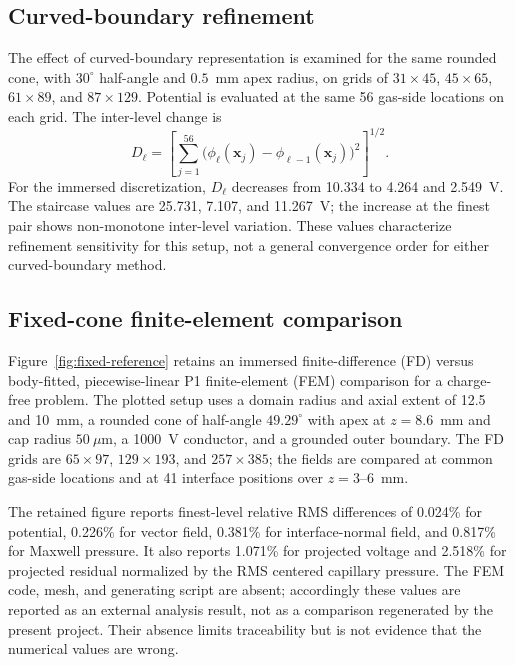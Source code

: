 \subsection{Curved-boundary refinement}
The effect of curved-boundary representation is examined for the same rounded cone, with $30^\circ$ half-angle and $0.5$~mm apex radius, on grids of $31\times45$, $45\times65$, $61\times89$, and $87\times129$. Potential is evaluated at the same 56 gas-side locations on each grid. The inter-level change is
\[
D_\ell=\left[\sum_{j=1}^{56}\bigl(\phi_\ell(\mathbf{x}_j)-\phi_{\ell-1}(\mathbf{x}_j)\bigr)^2\right]^{1/2}.
\]
For the immersed discretization, $D_\ell$ decreases from 10.334 to 4.264 and 2.549~V. The staircase values are 25.731, 7.107, and 11.267~V; the increase at the finest pair shows non-monotone inter-level variation. These values characterize refinement sensitivity for this setup, not a general convergence order for either curved-boundary method.

\subsection{Fixed-cone finite-element comparison}
Figure~\ref{fig:fixed-reference} retains an immersed finite-difference (FD) versus body-fitted, piecewise-linear P1 finite-element (FEM) comparison for a charge-free problem. The plotted setup uses a domain radius and axial extent of 12.5 and 10~mm, a rounded cone of half-angle $49.29^\circ$ with apex at $z=8.6$~mm and cap radius $50~\mu\mathrm{m}$, a 1000~V conductor, and a grounded outer boundary. The FD grids are $65\times97$, $129\times193$, and $257\times385$; the fields are compared at common gas-side locations and at 41 interface positions over $z=3$--6~mm.

The retained figure reports finest-level relative RMS differences of 0.024\% for potential, 0.226\% for vector field, 0.381\% for interface-normal field, and 0.817\% for Maxwell pressure. It also reports 1.071\% for projected voltage and 2.518\% for projected residual normalized by the RMS centered capillary pressure. The FEM code, mesh, and generating script are absent; accordingly these values are reported as an external analysis result, not as a comparison regenerated by the present project. Their absence limits traceability but is not evidence that the numerical values are wrong.

